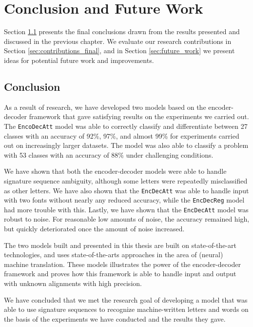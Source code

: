 
\chapter{Conclusion and Future Work}
\label{ch:conclusion}
Section \ref{sec:conclusion} presents the final conclusions drawn from the results presented and discussed in the previous chapter. We evaluate our research contributions in Section \ref{sec:contributions_final}, and in Section \ref{sec:future_work} we present ideas for potential future work and improvements.

\section{Conclusion}
\label{sec:conclusion}
As a result of research, we have developed two models based on the encoder-decoder framework that gave satisfying results on the experiments we carried out. The {\tt EncoDecAtt} model was able to correctly classify and differentiate between 27 classes with an accuracy of 92\%, 97\%, and almost 99\% for experiments carried out on increasingly larger datasets. The model was also able to classify a problem with 53 classes with an accuracy of 88\% under challenging conditions.

We have shown that both the encoder-decoder models were able to handle signature sequence ambiguity, although some letters were repeatedly misclassified as other letters. We have also shown that the {\tt EncDecAtt} was able to handle input with two fonts without nearly any reduced accuracy, while the {\tt EncDecReg} model had more trouble with this. Lastly, we have shown that the {\tt EncDecAtt} model was robust to noise. For reasonable low amounts of noise, the accuracy remained high, but quickly deteriorated once the amount of noise increased.

The two models built and presented in this thesis are built on state-of-the-art technologies, and uses state-of-the-arts approaches in the area of (neural) machine translation. These models illustrates the power of the encoder-decoder framework and proves how this framework is able to handle input and output with unknown alignments with high precision.

We have concluded that we met the research goal of developing a model that was able to use signature sequences to recognize machine-written letters and words on the basis of the experiments we have conducted and the results they gave.

